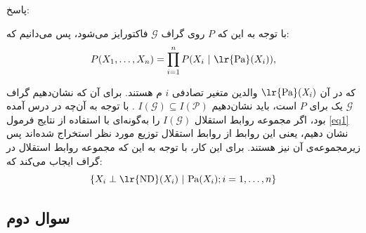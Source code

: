 \documentclass[11.5pt,a4paper]{article}
\begin{document}
پاسخ: 

با توجه به این که $\mathit{P}$ روی گراف $\mathcal{G}$ فاکتورایز می‌شود، پس می‌دانیم که: 
\begin{equation}
P (X_1 , \dots , X_n ) = \prod_{i=1}^n P (X_i \ | \ \text{\lr{Pa}}(X_i )),
\label{eq1}
\end{equation}

که در آن 
$\mathit{\text{\lr{Pa}}(X_i)}$ 
والدین متغیر تصادفی 
$\mathit{i}$
م هستند. برای آن که نشان‌دهیم گراف $\mathcal{G}$ یک 
برای 
$\mathit{P}$
است، باید نشان‌دهیم 
$\mathit{I}(\mathcal{G}) \subseteq \mathit{I}(\mathcal{P})$
. با توجه به آن‌چه در درس آمده بود، اگر مجموعه روابط استقلال 
$\mathit{I}(\mathcal{G})$
را به‌گونه‌ای با استفاده از نتایج فرمول \ref{eq1} نشان‌ دهیم، یعنی این روابط از روابط استقلال توزیع مورد نظر استخراج شده‌اند پس زیرمجموعه‌ی آن نیز هستند. برای این کار، با توجه به این که مجموعه روابط استقلال در گراف ایجاب می‌کند که: 
\begin{equation}
\lbrace X_{i} \perp \text{\lr{ND}}(X_{i}) \ | \ \text{Pa}(X_i); i = 1, \dots , n \rbrace
\label{eq2}
\end{equation}














\subsection{سوال دوم}
\end{document}
